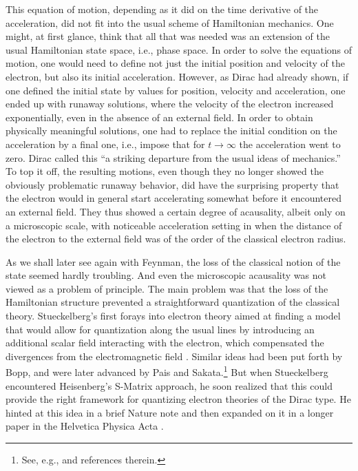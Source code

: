 \documentclass[12pt]{article}
\begin{document}
This equation of motion, depending as it did on the time derivative of the acceleration, did not fit into the usual scheme of Hamiltonian mechanics. One might, at first glance, think that all that was needed was an extension of the usual Hamiltonian state space, i.e., phase space. In order to solve the equations of motion, one would need to define not just the initial position and velocity of the electron, but also its initial acceleration. However, as Dirac had already shown, if one defined the initial state by values for position, velocity and acceleration, one ended up with runaway solutions, where the velocity of the electron increased exponentially, even in the absence of an external field. In order to obtain physically meaningful solutions, one had to replace the initial condition on the acceleration by a final one, i.e., impose that for $t \rightarrow \infty$ the acceleration went to zero. Dirac called this ``a striking departure from the usual ideas of mechanics.'' To top it off, the resulting motions, even though they no longer showed the obviously problematic runaway behavior, did have the surprising property that the electron would in general start accelerating somewhat before it encountered an external field. They thus showed a certain degree of acausality, albeit only on a microscopic scale, with noticeable acceleration setting in when the distance of the electron to the external field was of the order of the classical electron radius.

As we shall later see again with Feynman, the loss of the classical notion of the state seemed hardly troubling. And even the microscopic acausality was not viewed as a problem of principle. The main problem was that the loss of the Hamiltonian structure prevented a straightforward quantization of the classical theory. Stueckelberg's first forays into electron theory aimed at finding a model that would allow for quantization along the usual lines by introducing an additional scalar field interacting with the electron, which compensated the divergences from the electromagnetic field      \citep{stueckelberg_1939_a-new, stueckelberg_1941_un-nouveau}. Similar ideas had been put forth by Bopp, and were later advanced by Pais and Sakata.\footnote{See, e.g., \citep{blum_2015_qed} and references therein.} But when Stueckelberg encountered Heisenberg's S-Matrix approach, he soon realized that this could provide the right framework for quantizing electron theories of the Dirac type. He hinted at this idea in a brief Nature note \citep{stueckelberg_1944_an-unambiguous} and then expanded on it in a longer paper in the Helvetica Physica Acta \citep{stueckelberg_1944_un-modele}.
\end{document}
